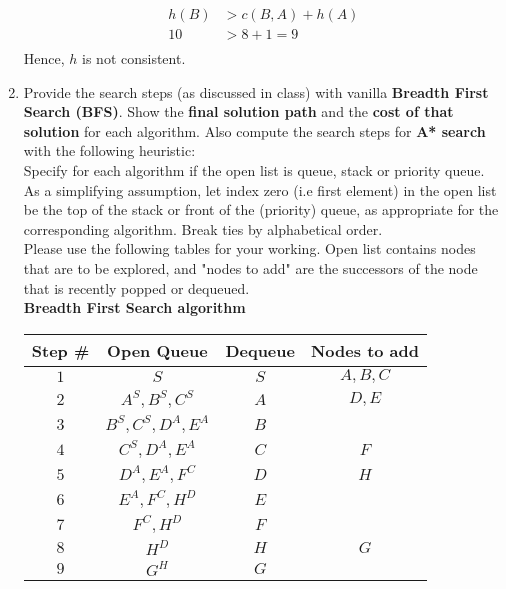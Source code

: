 \begin{enumerate}
\begin{align*}
          h(B) & > c(B,A) + h(A) \\
          10   & > 8 + 1 = 9     \\
        \end{align*}
        Hence, $h$ is not consistent.
  \item Provide the search steps (as discussed in class) with vanilla \textbf{Breadth First Search (BFS)}. Show the \textbf{final solution path} and the \textbf{cost of that solution} for each algorithm. Also compute the search steps for \textbf{A* search} with the following heuristic:\\[10pt]
        Specify for each algorithm if the open list is queue, stack or priority queue. As a simplifying assumption, let index zero (i.e first element) in the open list be the top of the stack or front of the (priority) queue, as appropriate for the corresponding algorithm. Break ties by alphabetical order.\\
        Please use the following tables for your working. Open list contains nodes that are to be explored, and "nodes to add" are the successors of the node that is recently popped or dequeued.\\[10pt]
        \textbf{Breadth First Search algorithm}
        \begin{center}
          \bgroup
          \def\arraystretch{1.5}%
          \captionsetup{type=figure}
          \begin{tabular}{|c|c|c|c|}
            \hline
            Step \# & Open Queue           & Dequeue & Nodes to add \\
            \hline
            $1$     & $S$                  & $S$     & $A,B,C$      \\
            $2$     & $A^S, B^S, C^S$      & $A$     & $D,E$        \\
            $3$     & $B^S, C^S, D^A, E^A$ & $B$     &              \\
            $4$     & $C^S, D^A, E^A$      & $C$     & $F$          \\
            $5$     & $D^A, E^A, F^C$      & $D$     & $H$          \\
            $6$     & $E^A, F^C, H^D$      & $E$     &              \\
            $7$     & $F^C, H^D$           & $F$     &              \\
            $8$     & $H^D$                & $H$     & $G$          \\
            $9$     & $G^H$                & $G$     &              \\

\end{tabular}
\end{center}
\end{enumerate}
